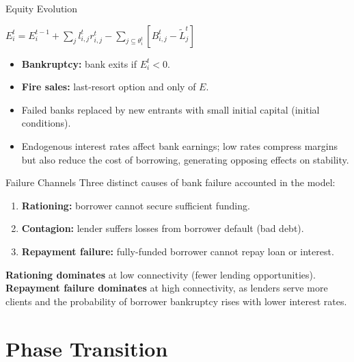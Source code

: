 \begin{frame}{Equity Evolution}
   \begin{block}{}
    \centering
    $ E^t_i = E^{t-1}_i + \sum_{j} l^{t}_{i,j} r^{t}_{i,j} - \sum_{j \subseteq \theta^t_i} \left[ B^{t}_{i,j} - \tilde{L}^t_j \right] $
  \end{block} 
  \begin{itemize}
    \item \textbf{Bankruptcy:} bank exits if $E_i^t < 0$.
    \item \textbf{Fire sales:} last-resort option and only of $E$.
    \item Failed banks replaced by new entrants with small initial capital (initial conditions).
    \item Endogenous interest rates affect bank earnings; low rates compress margins but also reduce the cost of borrowing, generating opposing effects on stability.
  \end{itemize}
\end{frame}


\begin{frame}{Failure Channels}
  Three distinct causes of bank failure accounted in the model:
  \begin{enumerate}
    \item \textbf{Rationing:} borrower cannot secure sufficient funding.
    \item \textbf{Contagion:} lender suffers losses from borrower default (bad debt).
    \item \textbf{Repayment failure:} fully-funded borrower cannot repay loan or interest.
  \end{enumerate}
  \vspace{0.3cm}
  \textbf{Rationing dominates} at low connectivity (fewer lending opportunities). \textbf{Repayment failure dominates} at high connectivity, as lenders serve more clients and the probability of borrower bankruptcy rises with lower interest rates.
\end{frame}



\section{Phase Transition}\label{sec:6}

